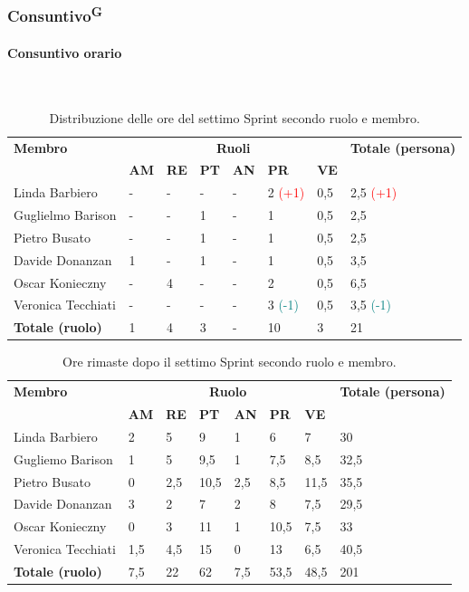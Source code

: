 \documentclass[8pt]{article}
\newcommand{\glossterm}[1]{#1\textsuperscript{G}} %
\newcommand{\subsubsubsection}[1]{\paragraph{#1}\mbox{}\\}
\begin{document}
\subsubsection{\glossterm{Consuntivo}}
\subsubsubsection{Consuntivo orario}
\begin{table}[ht!]
	\centering
	\begin{tabular}{p{4cm} p{1cm} p{1cm} p{1cm} p{1cm} p{1cm} p{1cm} p{3cm}}
		\toprule
		\textbf{Membro} & \multicolumn{6}{c}{\textbf{Ruoli}} & \textbf{Totale
        (persona)}\\
		& \textbf{AM} & \textbf{RE} & \textbf{PT} & \textbf{AN} & \textbf{PR} & \textbf{VE}\\
		\midrule
        Linda Barbiero          & - & - & - & - & 2 \textcolor{red}{(+1)} & 0,5 & 2,5 \textcolor{red}{(+1)} \\
        Guglielmo Barison       & - & - & 1 & - & 1 & 0,5 & 2,5 \\
        Pietro Busato           & - & - & 1 & - & 1 & 0,5 & 2,5 \\
        Davide Donanzan         & 1 & - & 1 & - & 1 & 0,5 & 3,5 \\
        Oscar Konieczny         & - & 4 & - & - & 2 & 0,5 & 6,5 \\
        Veronica Tecchiati      & - & - & - & - & 3 \textcolor{teal}{(-1)} & 0,5 & 3,5 \textcolor{teal}{(-1)} \\
        \midrule
        \textbf{Totale (ruolo)} & 1 & 4 & 3 & - & 10 & 3 & 21 \\
		\bottomrule
	\end{tabular}
	\caption{Distribuzione delle ore del settimo Sprint secondo ruolo e membro.}
	\label{table:Distribuzione delle ore del settimo Sprint secondo ruolo e membro}
\end{table}
\begin{table}[ht!]
	\centering
	\begin{tabular}{p{4cm} p{1cm} p{1cm} p{1cm} p{1cm} p{1cm} p{1cm} p{3cm}}
		\toprule
        \textbf{Membro} & \multicolumn{6}{c}{\textbf{Ruolo}} & \textbf{Totale (persona)}\\
		& \textbf{AM} & \textbf{RE} & \textbf{PT} & \textbf{AN} & \textbf{PR} & \textbf{VE}\\
		\midrule
        Linda Barbiero & 2 & 5 & 9 & 1 & 6 & 7 & 30 \\ 
        Gugliemo Barison & 1 & 5 & 9,5 & 1 & 7,5 & 8,5 & 32,5 \\ 
        Pietro Busato & 0 & 2,5 & 10,5 & 2,5 & 8,5 & 11,5 & 35,5 \\ 
        Davide Donanzan & 3 & 2 & 7 & 2 & 8 & 7,5 & 29,5 \\ 
        Oscar Konieczny & 0 & 3 & 11 & 1 & 10,5 & 7,5 & 33 \\ 
        Veronica Tecchiati & 1,5 & 4,5 & 15 & 0 & 13 & 6,5 & 40,5 \\ 
        \midrule
        \textbf{Totale (ruolo)} & 7,5 & 22 & 62 & 7,5 & 53,5 & 48,5 & 201 \\ 
        \bottomrule
	\end{tabular}
	\caption{Ore rimaste dopo il settimo Sprint secondo ruolo e membro.}
	\label{table:Ore rimaste dopo il settimo Sprint secondo ruolo e membro}
\end{table}
\end{document}

